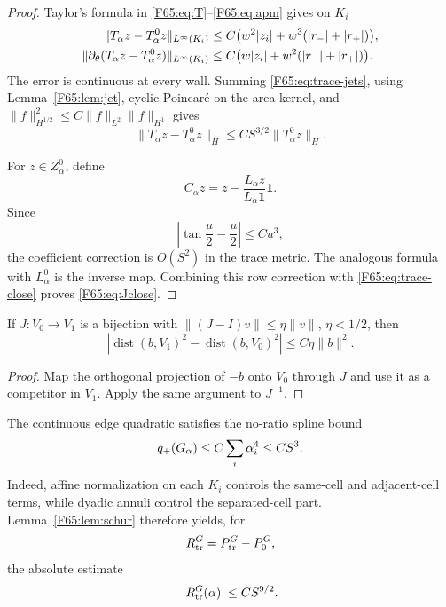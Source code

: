 \begin{proof}
Taylor's formula in \eqref{F65:eq:T}--\eqref{F65:eq:apm} gives on $K_i$
\begin{align}
 \|T_\alpha z-T_\alpha^0z\|_{L^\infty(K_i)}
 &\le C\bigl(w^2|z_i|+w^3(|r_-|+|r_+|)\bigr),\notag\\
 \|\partial_\theta(T_\alpha z-T_\alpha^0z)\|_{L^\infty(K_i)}
 &\le C\bigl(w|z_i|+w^2(|r_-|+|r_+|)\bigr).
 \label{F65:eq:trace-jets}
\end{align}
The error is continuous at every wall.  Summing \eqref{F65:eq:trace-jets},
using Lemma~\ref{F65:lem:jet}, cyclic Poincar\'e on the area kernel, and
$\|f\|_{H^{1/2}}^2\le C\|f\|_{L^2}\|f\|_{H^1}$ gives
\begin{equation}\label{F65:eq:trace-close}
 \|T_\alpha z-T_\alpha^0z\|_H
 \le CS^{3/2}\|T_\alpha^0z\|_H.
\end{equation}

For $z\in Z_\alpha^0$, define
\begin{equation}
 C_\alpha z=z-\frac{L_\alpha z}{L_\alpha\mathbf1}\mathbf1.
\end{equation}
Since
\begin{equation}
 \left|\tan\frac u2-\frac u2\right|\le Cu^3,
\end{equation}
the coefficient correction is $O(S^2)$ in the trace metric.  The analogous
formula with $L_\alpha^0$ is the inverse map.  Combining this row correction
with \eqref{F65:eq:trace-close} proves \eqref{F65:eq:Jclose}.
\end{proof}

\begin{lemma}\label{F65:lem:schur}
If $J:V_0\to V_1$ is a bijection with
$\|(J-I)v\|\le\eta\|v\|$, $\eta<1/2$, then
\begin{equation}\label{F65:eq:schur}
 \left|\operatorname {dist}(b,V_1)^2
 -\operatorname {dist}(b,V_0)^2\right|
 \le C\eta\|b\|^2.
\end{equation}
\end{lemma}

\begin{proof}
Map the orthogonal projection of $-b$ onto $V_0$ through $J$ and use it as
a competitor in $V_1$.  Apply the same argument to $J^{-1}$.
\end{proof}

The continuous edge quadratic satisfies the no-ratio spline bound
\begin{equation}\label{F65:eq:Gbound}
 q_+(G_\alpha)\le C\sum_i\alpha_i^4\le CS^3.
\end{equation}
Indeed, affine normalization on each $K_i$ controls the same-cell and
adjacent-cell terms, while dyadic annuli control the separated-cell part.
Lemma~\ref{F65:lem:schur} therefore yields, for
\begin{equation}
 R_{\rm tr}^G=P_{\rm tr}^G-P_0^G,
\end{equation}
the absolute estimate
\begin{equation}\label{F65:eq:trace-absolute}
 |R_{\rm tr}^G(\alpha)|\le CS^{9/2}.
\end{equation}

